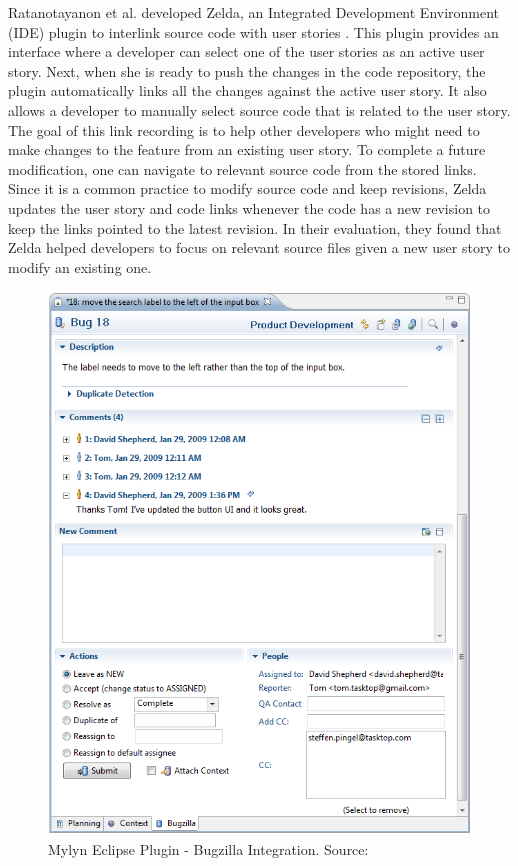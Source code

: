 Ratanotayanon et al. developed Zelda, an Integrated Development Environment (IDE) plugin to interlink source code with user stories \cite{supporting_program}. This plugin provides an interface where a developer can select one of the user stories as an active user story. Next, when she is ready to push the changes in the code repository, the plugin automatically links all the changes against the active user story. It also allows a developer to manually select source code that is related to the user story. The goal of this link recording is to help other developers who might need to make changes to the feature from an existing user story. To complete a future modification, one can navigate to relevant source code from the stored links. Since it is a common practice to modify source code and keep revisions, Zelda updates the user story and code links whenever the code has a new revision to keep the links pointed to the latest revision. In their evaluation, they found that Zelda helped developers to focus on relevant source files given a new user story to modify an existing one.

\afterpage{\clearpage}
\begin{figure}[!htb]
	\centering
	\includegraphics[width=\textwidth]{Mylyn-comment.png}
    \caption{Mylyn Eclipse Plugin - Bugzilla Integration. Source: \cite{mylyn}}
	\label{fig:mylyn-comment}
\end{figure}

